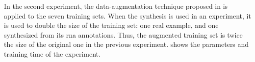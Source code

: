 
In the second experiment, the data-augmentation technique
proposed in \textcite{napoleslopez2021augmentednet} is
applied to the seven training sets. When the synthesis is
used in an experiment, it is used to double the size of the
training set: one real example, and one synthesized from its
\gls{rna} annotations. Thus, the augmented training set is
twice the size of the original one in the previous
experiment.  shows the
parameters and training time of the experiment.

